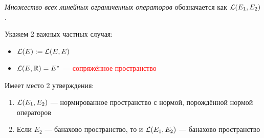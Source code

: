 \begin{definition}
	\textit{Множество всех линейных ограниченных операторов} обозначается как $\mathcal{L}(E_1, E_2)$.
\end{definition}

\begin{note}
	Укажем 2 важных частных случая:
	\begin{itemize}
		\item $\mathcal{L}(E) := \mathcal{L}(E, E)$
		
		\item $\mathcal{L}(E, \mathbb{R}) = E^*$  --- \textcolor{red}{сопряжённое пространство}
	\end{itemize}
\end{note}

\begin{theorem}
	Имеет место 2 утверждения:
	\begin{enumerate}
		\item $\mathcal{L}(E_1, E_2)$ --- нормированное пространство с нормой, порождённой нормой операторов
		
		\item Если $E_2$ --- банахово пространство, то и $\mathcal{L}(E_1, E_2)$ --- банахово пространство
	\end{enumerate}
\end{theorem}

